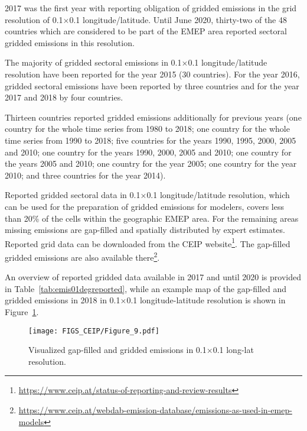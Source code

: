 2017 was the first year with reporting obligation of gridded emissions in the grid resolution of  0.1{\degrees}$\times$0.1{\degrees} lon\-gi\-tude/la\-ti\-tude.
Until June 2020, thirty-two of the 48 countries which are considered to be part of the EMEP area reported sectoral gridded emissions in this resolution.

The majority of gridded sectoral emissions in 0.1{\degrees}$\times$0.1{\degrees} lon\-gi\-tude/la\-ti\-tude resolution have been reported for the year 2015 (30 countries). For the year 2016, gridded sectoral emissions have been reported by three countries and for the year 2017 and 2018 by four countries.

Thirteen countries reported gridded emissions additionally for previous years (one country for the whole time series
from 1980 to 2018; one country for the whole time series from 1990 to 2018; five countries for the years 1990, 1995,
2000, 2005 and 2010; one country for the years 1990, 2000, 2005 and 2010; one country for the years 2005 and 2010; one
country for the year 2005; one country for the year 2010; and three countries for the year 2014). 

Reported gridded sectoral data in 0.1{\degrees}$\times$0.1{{\degrees}} lon\-gi\-tude/la\-ti\-tude resolution, which can be used for the preparation of gridded emissions for modelers, covers less than 20\% of the cells within the geographic EMEP area. For the remaining areas missing emissions are gap-filled and spatially distributed by expert estimates. Reported grid data can be downloaded from the CEIP website\footnote{\url{https://www.ceip.at/status-of-reporting-and-review-results}}. The gap-filled gridded emissions are also available there\footnote{\url{https://www.ceip.at/webdab-emission-database/emissions-as-used-in-emep-models}}. 

An overview of reported gridded data available in 2017 and until 2020 is provided in Table~\ref{tab:emis01degreported}, while an example map of the gap-filled and gridded \nox emissions in 2018 in 0.1{\degrees}$\times$0.1{\degrees} longitude-latitude resolution is shown in Figure~\ref{fig:CEIP9}.  

\begin{figure}[h]
\centering
{\texttt{[image: FIGS\_CEIP/Figure\_9.pdf]}}
\caption{Visualized gap-filled and gridded \nox emissions in 0.1{\degrees}$\times$0.1{\degrees} long-lat resolution.
}
\label{fig:CEIP9}
\end{figure}


